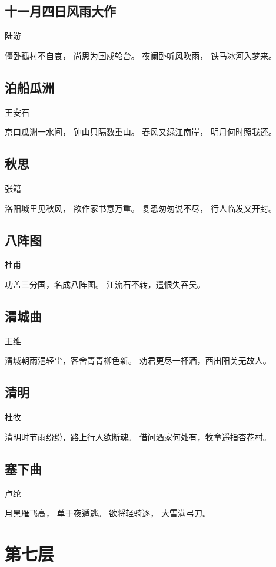 \documentclass[12pt,UTF8]{ctexbook}
\begin{document}
\section{十一月四日风雨大作}

陆游

僵卧孤村不自哀，
尚思为国戍轮台。
夜阑卧听风吹雨，
铁马冰河入梦来。

\section{泊船瓜洲}

王安石

京口瓜洲一水间，
钟山只隔数重山。
春风又绿江南岸，
明月何时照我还。

\section{秋思}

张籍

洛阳城里见秋风，
欲作家书意万重。
复恐匆匆说不尽，
行人临发又开封。

\section{八阵图}

杜甫

功盖三分国，名成八阵图。
江流石不转，遣恨失吞吴。

\section{渭城曲}

王维

渭城朝雨浥轻尘，客舍青青柳色新。
劝君更尽一杯酒，西出阳关无故人。

\section{清明}

杜牧

清明时节雨纷纷，路上行人欲断魂。
借问酒家何处有，牧童遥指杏花村。

\section{塞下曲}

卢纶

月黑雁飞高，
单于夜遁逃。
欲将轻骑逐，
大雪满弓刀。

\chapter{第七层}
\end{document}
